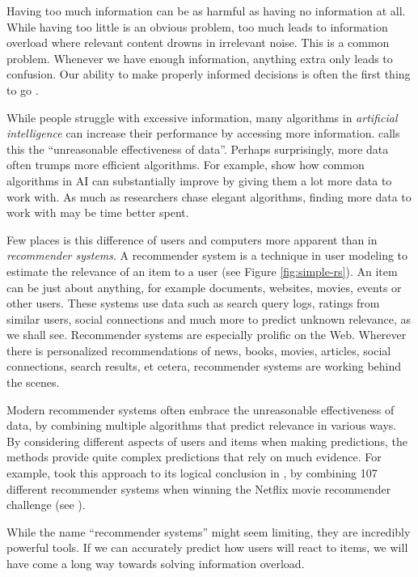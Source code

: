 \label{chap:intro}

Having too much information can be as harmful as having no information at all.
While having too little is an obvious problem,
too much leads to information overload where relevant content drowns in irrelevant noise.
This is a common problem. Whenever we have enough information,
anything extra only leads to confusion.
Our ability to make properly informed decisions is often the first thing to go
\cite[p.1]{Davenport2001}.

While people struggle with excessive information,
many algorithms in \emph{artificial intelligence}  
can increase their performance by accessing more information.
\citet{Halevy2009} calls this the ``unreasonable effectiveness of data''.
Perhaps surprisingly, more data often trumps more efficient algorithms.
For example, \citet[p.3]{Banko2001} show how common algorithms in AI 
can substantially improve by giving them a lot more data to work with.
As much as researchers chase elegant algorithms, finding more data to work with may be time better spent.

Few places is this difference of users and computers more apparent than in \emph{recommender systems}.
A recommender system is a technique in user modeling to estimate the relevance of an item to a user
(see Figure \ref{fig:simple-rs}).
An item can be just about anything, for example documents, websites, movies, events or other users.
These systems use data such as search query logs, 
ratings from similar users, social connections and much more
to predict unknown relevance, as we shall see.
Recommender systems are especially prolific on the Web. 
Wherever there is personalized recommendations of news, books, movies,
articles, social connections, search results, et cetera, recommender systems are working behind the scenes.

Modern recommender systems often embrace the 
unreasonable effectiveness of data,
by combining multiple algorithms that predict relevance in various ways.
By considering different aspects of users and items when making predictions,
the methods provide quite complex predictions that rely on much evidence.
For example, \citeauthor{Bell2007} took this approach to its logical conclusion in \citet[p.1]{Bell2007}, by 
combining 107 different recommender systems when winning the 
Netflix movie recommender challenge
(see \citet{Linden2009}).

While the name ``recommender systems'' might seem limiting, they are incredibly powerful tools.
If we can accurately predict how users will react to items,
we will have come a long way towards solving information overload.

